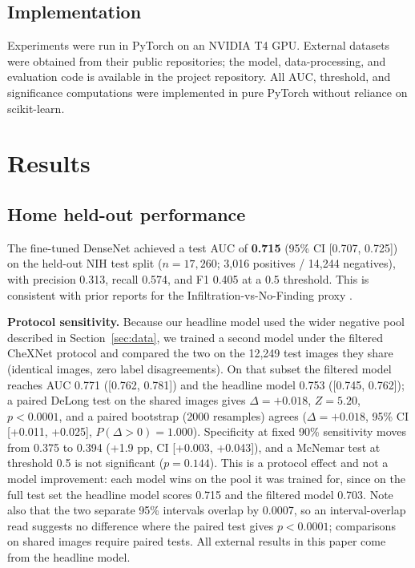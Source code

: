 \documentclass[runningheads]{llncs}
\begin{document}
\subsection{Implementation}
Experiments were run in PyTorch on an NVIDIA T4 GPU. External datasets were obtained from their public repositories; the model, data-processing, and evaluation code is available in the project repository. All AUC, threshold, and significance computations were implemented in pure PyTorch without reliance on scikit-learn.

\section{Results}
\subsection{Home held-out performance}\label{sec:protocol}
The fine-tuned DenseNet achieved a test AUC of \textbf{0.715} (95\% CI [0.707, 0.725]) on the held-out NIH test split ($n=17{,}260$; 3,016 positives / 14,244 negatives), with precision 0.313, recall 0.574, and F1 0.405 at a 0.5 threshold. This is consistent with prior reports for the Infiltration-vs-No-Finding proxy \cite{wang2017,rajpurkar2017}.

\textbf{Protocol sensitivity.} Because our headline model used the wider negative pool described in Section~\ref{sec:data}, we trained a second model under the filtered CheXNet protocol and compared the two on the 12,249 test images they share (identical images, zero label disagreements). On that subset the filtered model reaches AUC 0.771 ([0.762, 0.781]) and the headline model 0.753 ([0.745, 0.762]); a paired DeLong test on the shared images gives $\Delta = +0.018$, $Z = 5.20$, $p < 0.0001$, and a paired bootstrap (2000 resamples) agrees ($\Delta = +0.018$, 95\% CI [+0.011, +0.025], $P(\Delta>0) = 1.000$). Specificity at fixed 90\% sensitivity moves from 0.375 to 0.394 (+1.9 pp, CI [+0.003, +0.043]), and a McNemar test at threshold 0.5 is not significant ($p = 0.144$). This is a protocol effect and not a model improvement: each model wins on the pool it was trained for, since on the full test set the headline model scores 0.715 and the filtered model 0.703. Note also that the two separate 95\% intervals overlap by 0.0007, so an interval-overlap read suggests no difference where the paired test gives $p<0.0001$; comparisons on shared images require paired tests. All external results in this paper come from the headline model.
\end{document}
